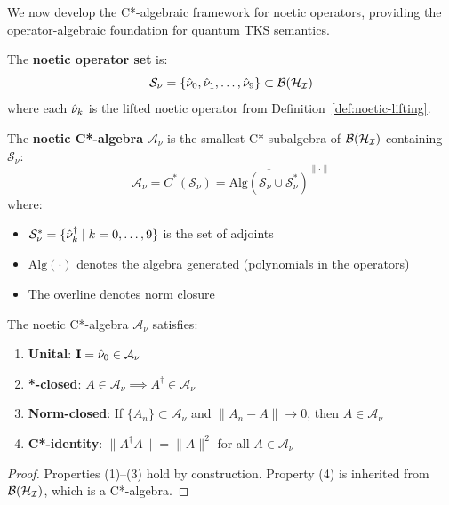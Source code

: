 We now develop the C*-algebraic framework for noetic operators, providing the operator-algebraic foundation for quantum TKS semantics.

\begin{definition}
\label{def:noetic-op-set}
The \textbf{noetic operator set} is:
\[
\mathcal{S}_\nu = \{\hat{\nu}_0, \hat{\nu}_1, \ldots, \hat{\nu}_9\} \subset \mathcal{B}(\mathcal{H}_{\mathcal{I}})
\]
where each $\hat{\nu}_k$ is the lifted noetic operator from Definition~\ref{def:noetic-lifting}.
\end{definition}

\begin{definition}
\label{def:noetic-cstar}
The \textbf{noetic C*-algebra} $\mathcal{A}_\nu$ is the smallest C*-subalgebra of $\mathcal{B}(\mathcal{H}_{\mathcal{I}})$ containing $\mathcal{S}_\nu$:
\[
\mathcal{A}_\nu = C^*(\mathcal{S}_\nu) = \overline{\mathrm{Alg}(\mathcal{S}_\nu \cup \mathcal{S}_\nu^*)}^{\|\cdot\|}
\]
where:
\begin{itemize}
  \item $\mathcal{S}_\nu^* = \{\hat{\nu}_k^\dagger \mid k = 0,\ldots,9\}$ is the set of adjoints
  \item $\mathrm{Alg}(\cdot)$ denotes the algebra generated (polynomials in the operators)
  \item The overline denotes norm closure
\end{itemize}
\end{definition}

\begin{proposition}
\label{prop:cstar-props}
The noetic C*-algebra $\mathcal{A}_\nu$ satisfies:
\begin{enumerate}
  \item \textbf{Unital}: $\mathbf{I} = \hat{\nu}_0 \in \mathcal{A}_\nu$
  \item \textbf{*-closed}: $A \in \mathcal{A}_\nu \implies A^\dagger \in \mathcal{A}_\nu$
  \item \textbf{Norm-closed}: If $\{A_n\} \subset \mathcal{A}_\nu$ and $\|A_n - A\| \to 0$, then $A \in \mathcal{A}_\nu$
  \item \textbf{C*-identity}: $\|A^\dagger A\| = \|A\|^2$ for all $A \in \mathcal{A}_\nu$
\end{enumerate}
\end{proposition}

\begin{proof}
Properties (1)--(3) hold by construction. Property (4) is inherited from $\mathcal{B}(\mathcal{H}_{\mathcal{I}})$, which is a C*-algebra.
\end{proof}

